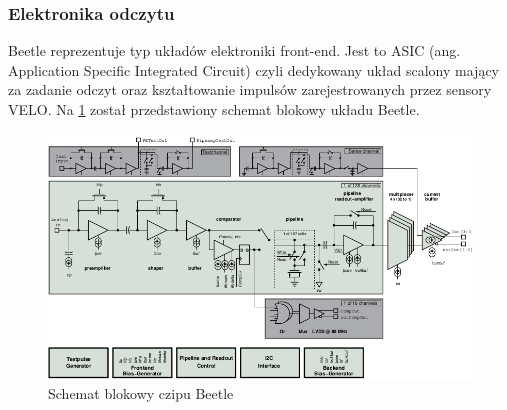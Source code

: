 \subsubsection{Elektronika odczytu}
Beetle reprezentuje typ układów elektroniki front-end. Jest to ASIC (ang.  Application Specific Integrated Circuit) czyli dedykowany układ scalony mający za zadanie odczyt oraz kształtowanie impulsów zarejestrowanych przez sensory VELO.  Na \ref{fig:Beetle_Block} został przedstawiony schemat blokowy układu Beetle.
\begin{figure}[ht]
 \centering
 \includegraphics[scale=0.8]{rozdzial2/Beetle_block.jpeg}
 \caption{Schemat blokowy czipu Beetle\cite{Beetle}}
 \label{fig:Beetle_Block}
\end{figure}

